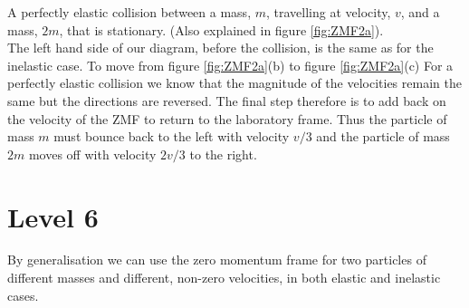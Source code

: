  A perfectly elastic collision between a mass, $m$, travelling at velocity, $v$, and a mass, $2m$, that is stationary. (Also explained in figure \ref{fig:ZMF2a}).\\

\noindent The left hand side of our diagram, before the collision, is the same as for the inelastic case.   \nll  To move from figure \ref{fig:ZMF2a}(b) to figure \ref{fig:ZMF2a}(c)  For a perfectly elastic collision we know that the magnitude of the velocities remain the same but the directions are reversed. 
\nll The final step therefore is to add back on the velocity of the ZMF to return to the laboratory frame.  Thus the particle of mass $m$ must bounce back to the left with velocity $v/3$ and the particle of mass $2m$ moves off with velocity $2v/3$ to the right.

\section{Level 6}
By generalisation we can use the zero momentum frame for two particles of different masses and different, non-zero velocities, in both elastic and inelastic cases.

